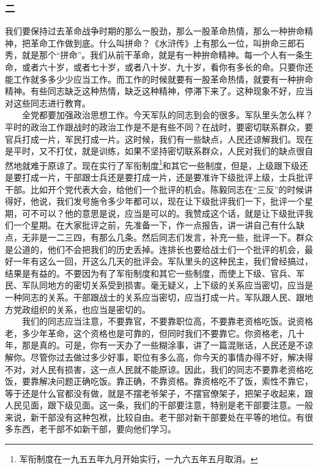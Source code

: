 \documentclass[cn,11pt,chinese]{elegantbook}
\def\myformat#1{\hfil\hfil #1}
\begin{document}
\subsubsection*{\myformat{二}}
我们要保持过去革命战争时期的那么一股劲，那么一股革命热情，那么一种拚命精神，把革命工作做到底。什么叫拼命？《水浒传》上有那么一位，叫拚命三郎石秀，就是那个“拼命”。我们从前干革命，就是有一种拚命精神。每一个人有一条生命，或者六十岁，或者七十岁，或者八十岁、九十岁，看你有多长的命。只要你还能工作就多多少少应当工作。而工作的时候就要有一股革命热情，就要有一种拚命精神。有些同志缺乏这种热情，缺乏这种精神，停滞下来了。这种现象不好，应当对这些同志进行教育。\\
　　全党都要加强政治思想工作。今天军队的同志到会的很多。军队里头怎么样？平时的政治工作跟战时的政治工作是不是有些不同？在战时，要密切联系群众，要官兵打成一片，军民打成一片。这时候，我们有一些缺点，人民还谅解我们。现在是平时，又不打仗，就是训练，如果不坚持密切联系群众，人民对我们的缺点很自然地就难于原谅了。现在实行了军衔制度\footnote[2]{ 军衔制度在一九五五年九月开始实行，一九六五年五月取消。}和其它一些制度，但是，上级跟下级还是要打成一片，干部跟士兵还是要打成一片，还是要准许下级批评上级，士兵批评干部。比如开个党代表大会，给他们一个批评的机会。陈毅同志在“三反”的时候讲得好，他说，我们发号施令多少年都可以，现在让下级批评我们一下，批评一个星期，可不可以？他的意思是说，应当是可以的。我赞成这个话，就是让下级批评我们一个星期。在大家批评之前，先准备一下，作一点报告，讲一讲自己有什么缺点，无非是一二三四，有那么几条。然后同志们发言，补充一些，批评一下。群众是公道的，他们不会把我们的历史丢掉。连排长也要给战士们一个批评的机会，最好一年有这么一回，开这么几天的批评会。军队里头的这种民主，我们曾经搞过，结果是有益的。不要因为有了军衔制度和其它一些制度，而使上下级、官兵、军民、军队同地方的密切关系受到损害。毫无疑义，上下级的关系应当密切，应当是一种同志的关系。干部跟战士的关系应当密切，应当打成一片。军队跟人民、跟地方党政组织的关系，也应当是密切的。\\
　　我们的同志应当注意，不要靠官，不要靠职位高，不要靠老资格吃饭。说资格老，多少年革命，这个资格也是可靠的，但同时我们不要靠它。你资格老，几十年，那是真的。可是，你有一天办了一些糊涂事，讲了一篇混账话，人民还是不谅解你。尽管你过去做过多少好事，职位有多么高，你今天的事情办得不好，解决得不对，对人民有损害，这一点人民就不能原谅。因此，我们的同志不要靠老资格吃饭，要靠解决问题正确吃饭。靠正确，不靠资格。靠资格吃不了饭，索性不靠它，等于还是什么官都没有做，就是不摆老爷架子，不摆官僚架子，把架子收起来，跟人民见面，跟下级见面。这一条，我们的干部要注意，特别是老干部要注意。一般来说，新干部没有这种包袱，比较自由。老干部对新干部要处在平等的地位。有很多东西，老干部不如新干部，要向他们学习。\\
\end{document}
